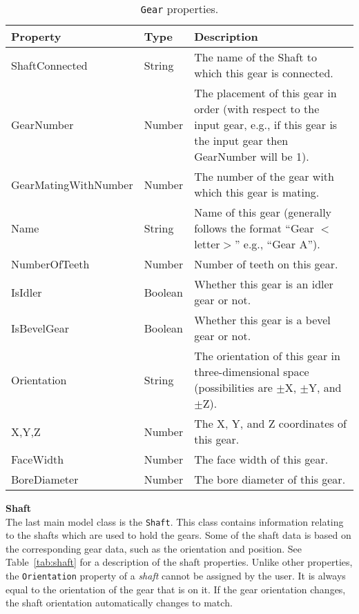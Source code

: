 \begin{doublespace}
\begin{table}[htbp]
    \centering
    \caption{\texttt{Gear} properties.}
    \label{tab:gear}
    \begin{tabularx}{1\textwidth}{||Y|Y|Y||}
        \hline Property & Type & Description \\ \hline \hline
        ShaftConnected & String & The name of the Shaft to which this gear is connected. \\ \hline
        GearNumber & Number & The placement of this gear in order (with respect to the input gear, e.g., if this gear is the input gear then GearNumber will be 1). \\ \hline
        GearMatingWithNumber & Number & The number of the gear with which this gear is mating. \\ \hline
        Name & String & Name of this gear (generally follows the format ``Gear $<$letter$>$'' e.g., ``Gear A''). \\ \hline
        NumberOfTeeth & Number & Number of teeth on this gear. \\ \hline
        IsIdler & Boolean & Whether this gear is an idler gear or not. \\ \hline
        IsBevelGear & Boolean & Whether this gear is a bevel gear or not. \\ \hline
        Orientation & String & The orientation of this gear in three-dimensional space (possibilities are $\pm$X, $\pm$Y, and $\pm$Z). \\ \hline
        X,Y,Z & Number & The X, Y, and Z coordinates of this gear. \\ \hline
        FaceWidth & Number & The face width of this gear. \\ \hline
        BoreDiameter & Number & The bore diameter of this gear. \\ \hline
    \end{tabularx}
\end{table}

\noindent\textbf{Shaft} \\
The last main model class is the \texttt{Shaft}. This class contains information relating to the shafts which are used to hold the gears. Some of the shaft data is based on the corresponding gear data, such as the orientation and position. See Table~\ref{tab:shaft} for a description of the shaft properties. Unlike other properties, the \texttt{Orientation} property of a \emph{shaft} cannot be assigned by the user. It is always equal to the orientation of the gear that is on it. If the gear orientation changes, the shaft orientation automatically changes to match.


\end{doublespace}
